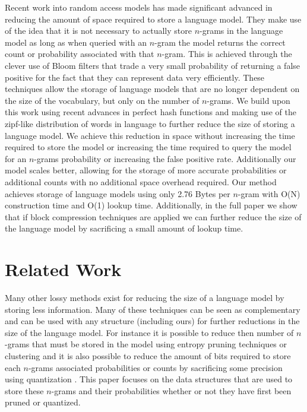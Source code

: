 \documentclass[10pt, a4paper]{article}
\begin{document}
Recent work into random access models \cite{Talbot07smoothedbloom,talbot1,talbot-osborne:2007:ACLMain} has made significant advanced in reducing the amount of space required to store a language model. They make use of the idea that it is not necessary to actually store $n$-grams in the language model as long as when queried with an $n$-gram the model returns the correct count or probability associated with that $n$-gram.  This is achieved through the clever use of Bloom filters \cite{bloom} that trade a very small probability of returning a false positive for the fact that they can represent data very efficiently.  These techniques allow the storage of language models that are no longer dependent on the size of the vocabulary, but only on the number of $n$-grams.  We build upon this work using recent advances in perfect hash functions and making use of the zipf-like distribution of words in language to further reduce the size of storing a language model.  We achieve this reduction in space without increasing the time required to store the model or increasing the time required to query the model for an $n$-grams probability or increasing the false positive rate.  Additionally our model scales better, allowing for the storage of more accurate probabilities or additional counts with no additional space overhead required.  Our method achieves storage of language models using only 2.76 Bytes per $n$-gram with O(N) construction time and O(1) lookup time.  Additionally, in the full paper we show that if block compression techniques are applied we can further reduce the size of the language model by sacrificing a small amount of lookup time.

\section{Related Work}

Many other lossy methods exist for reducing the size of a language model by storing less information. Many of these techniques can be seen as complementary and can be used with any structure (including ours) for further reductions in the size of the language model.  For instance it is possible to reduce then number of $n$-grams that must be stored in the model using entropy pruning techniques \cite{Stolcke98entropy} or clustering \cite{Jelinek90self-organizedlanguage,Goodman00l} and it is also possible to reduce the amount of bits required to store each $n$-grams associated probabilities or counts by sacrificing some precision using quantization \cite{quantization}.  This paper focuses on the data structures that are used to store these $n$-grams and their probabilities whether or not they have first been pruned or quantized.  
\end{document}

